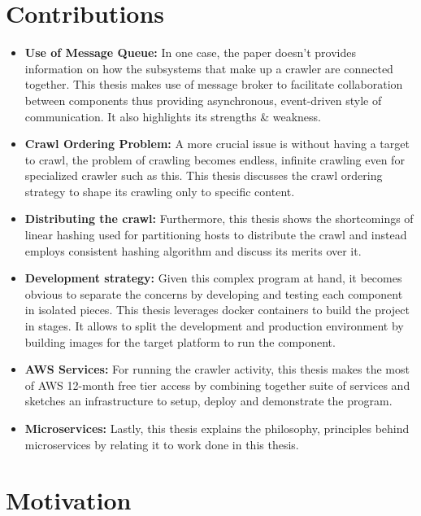 \section{Contributions}
\begin{itemize}
  \item \textbf{Use of Message Queue:} In one case, the paper doesn't provides information on how the subsystems that make up a crawler are connected together. This thesis makes use of message broker to facilitate collaboration between components thus providing asynchronous, event-driven style of communication. It also highlights its strengths \& weakness.
   \item \textbf{Crawl Ordering Problem:} A more crucial issue is without having a target to crawl, the problem of crawling becomes endless, infinite crawling even for specialized crawler such as this. This thesis discusses the crawl ordering strategy to shape its crawling only to specific content.
   \item \textbf{Distributing the crawl:} Furthermore, this thesis shows the shortcomings of linear hashing used for partitioning hosts to distribute the crawl and instead employs consistent hashing\cite{consisthash} algorithm and discuss its merits over it.
    \item \textbf{Development strategy:}  Given this complex program at hand, it becomes obvious to separate the concerns by developing and testing each component in isolated pieces. This thesis leverages docker containers to build the project in stages. It allows to split the development and production environment by building images for the target platform to run the component.
    \item \textbf{AWS Services:} For running the crawler activity, this thesis makes the most of AWS 12-month free tier access by combining together suite of services and sketches an infrastructure to setup, deploy and demonstrate the program.
    \item \textbf{Microservices:} Lastly, this thesis explains the philosophy, principles behind microservices \cite{microservices} by relating it to work done in this thesis.
\end{itemize}

\pagebreak

\section{Motivation}

